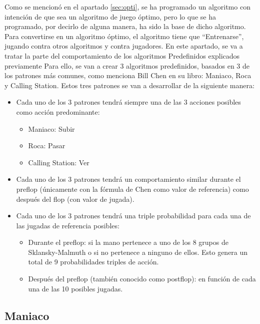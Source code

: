 Como se mencionó en el apartado \ref{sec:opti}, se ha programado un algoritmo con intención de que sea un algoritmo de juego óptimo, pero lo que se ha programado, por decirlo de alguna manera, ha sido la base de dicho algoritmo. Para convertirse en un algoritmo óptimo, el algoritmo tiene que “Entrenarse”, jugando contra otros algoritmos y contra jugadores. En este apartado, se va a tratar la parte del comportamiento de los algoritmos Predefinidos explicados previamente
Para ello, se van a crear 3 algoritmos predefinidos, basados en 3 de los patrones más comunes, como menciona Bill Chen en su libro\cite{chen}: Maniaco, Roca y Calling Station.
Estos tres patrones se van a desarrollar de la siguiente manera:
\begin{itemize}
\item Cada uno de los 3 patrones tendrá siempre una de las 3 acciones posibles como acción predominante:
\begin{itemize}
\item Maniaco: Subir
\item Roca: Pasar
\item Calling Station: Ver
\end{itemize}
\item Cada uno de los 3 patrones tendrá un comportamiento similar durante el preflop (únicamente con la fórmula de Chen como valor de referencia) como después del flop (con valor de jugada).
\item Cada uno de los 3 patrones tendrá una triple probabilidad para cada una de las jugadas de referencia posibles:
\begin{itemize}
\item Durante el preflop: si la mano pertenece a uno de los 8 grupos de Sklansky-Malmuth o si no pertenece a ninguno de ellos. Esto genera un total de 9 probabilidades triples de acción.
\item Después del preflop (también conocido como postflop): en función de cada una de las 10 posibles jugadas.
\end{itemize}
\end{itemize}

\subsection{Maniaco}

